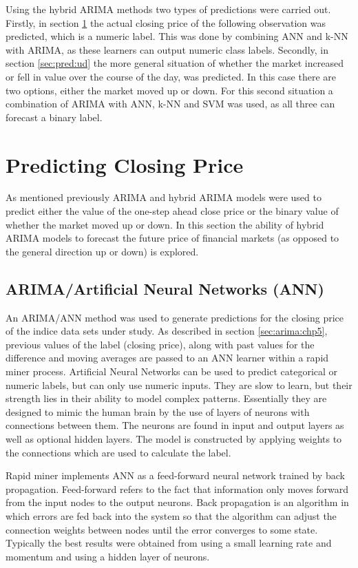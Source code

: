 Using the hybrid ARIMA methods two types of predictions were carried out. Firstly, in section \ref{sec:pred:cp} the actual closing price of the following observation was predicted, which is a numeric label. This was done by combining ANN and k-NN with ARIMA, as these learners can output numeric class labels. Secondly, in section \ref{sec:pred:ud} the more general situation of whether the market increased or fell in value over the course of the day, was predicted. In this case there are two options, either the market moved up or down. For this second situation a combination of ARIMA with ANN, k-NN and SVM was used, as all three can forecast a binary label.

\section{Predicting Closing Price}
\label{sec:pred:cp}
As mentioned previously ARIMA and hybrid ARIMA models were used to predict either the value of the one-step ahead close price or the binary value of whether the market moved up or down. In this section the ability of hybrid ARIMA models to forecast the future price of financial markets (as opposed to the general direction up or down) is explored.

\subsection{ARIMA/Artificial Neural Networks (ANN)}
\label{sec:cp_ann}
An ARIMA/ANN method was used to generate predictions for the closing price of the indice data sets under study. As described in section \ref{sec:arima:chp5}, previous values of the label (closing price), along with past values for the difference and moving averages are passed to an ANN learner within a rapid miner process. Artificial Neural Networks can be used to predict categorical or numeric labels, but can only use numeric inputs. They are slow to learn, but their strength lies in their ability to model complex patterns. Essentially they are designed to mimic the human brain by the use of layers of neurons with connections between them. The neurons are found in input and output layers as well as optional hidden layers. The model is constructed by applying weights to the connections which are used to calculate the label.

Rapid miner implements ANN as a feed-forward neural network trained by back propagation. Feed-forward refers to the fact that information only moves forward from the input nodes to the output neurons. Back propagation is an algorithm in which errors are fed back into the system so that the algorithm can adjust the connection weights between nodes until the error converges to some state. Typically the best results were obtained from using a small learning rate and momentum and using a hidden layer of neurons.

